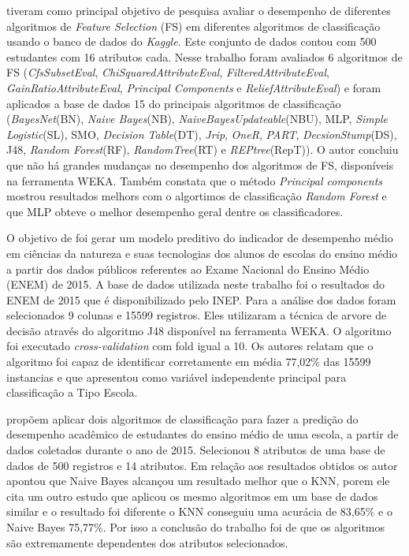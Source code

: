 \documentclass[ti]{texufpel} %
\begin{document}
\citet{zaffar2017performance} tiveram como principal objetivo de pesquisa avaliar o desempenho de diferentes algoritmos de \textit{Feature Selection} (FS) em diferentes algoritmos de classificação usando o banco de dados do \textit{Kaggle}. Este conjunto de dados contou com 500 estudantes com 16 atributos cada. Nesse trabalho foram avaliados 6 algoritmos de FS (\textit{CfsSubsetEval}, \textit{ChiSquaredAttributeEval}, \textit{FilteredAttributeEval}, \textit{GainRatioAttributeEval}, \textit{Principal Components} e \textit{ReliefAttributeEval}) e foram aplicados a base de dados 15 do principais algoritmos de classificação (\textit{BayesNet}(BN), \textit{Naive Bayes}(NB), \textit{NaiveBayesUpdateable}(NBU), MLP, \textit{Simple Logistic}(SL), SMO, \textit{Decision Table}(DT), \textit{Jrip}, \textit{OneR}, \textit{PART}, \textit{DecsionStump}(DS), J48, \textit{Random Forest}(RF), \textit{RandomTree}(RT) e \textit{REPtree}(RepT)). O autor concluiu que não há grandes mudanças no desempenho dos algoritmos de FS, disponíveis na ferramenta WEKA. Também constata que o método \textit{Principal components} mostrou resultados melhors com o algortimos de classificação \textit{Random Forest} e que MLP obteve o melhor desempenho geral dentre os classificadores.

O objetivo de \citet{simon2017mineraccao} foi gerar um modelo preditivo do indicador de desempenho médio em ciências da natureza e suas tecnologias dos alunos de escolas do ensino médio a partir dos dados públicos referentes ao Exame Nacional do Ensino Médio (ENEM) de 2015. A base de dados utilizada neste trabalho foi o resultados do ENEM de 2015 que é disponibilizado pelo INEP. Para a análise dos dados foram selecionados 9 colunas e 15599 registros. Eles utilizaram a técnica de arvore de decisão através do algoritmo J48 disponível na ferramenta WEKA. O algoritmo foi executado \textit{cross-validation} com fold igual a 10. Os autores relatam que o algoritmo foi capaz de identificar corretamente em média 77,02\% das 15599 instancias e que apresentou como variável independente principal para classificação a Tipo Escola.

\citet{amra2017students} propõem aplicar dois algoritmos de classificação para fazer a predição do desempenho acadêmico de estudantes do ensino médio de uma escola, a partir de dados coletados durante o ano de 2015. Selecionou 8 atributos de uma base de dados de 500 registros e 14 atributos. Em relação aos resultados obtidos os autor apontou que Naive Bayes alcançou um resultado melhor que o KNN, porem ele cita um outro estudo que aplicou os mesmo algoritmos em um base de dados similar e o resultado foi diferente o KNN conseguiu uma acurácia de 83,65\% e o Naive Bayes 75,77\%. Por isso a conclusão do trabalho foi de que os algoritmos são extremamente dependentes dos atributos selecionados.
\end{document}
